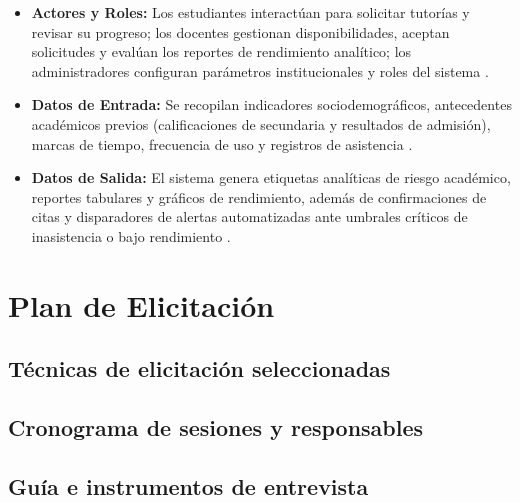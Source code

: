 \documentclass[11pt, a4paper]{article}
\begin{document}
\begin{itemize}
    \item \textbf{Actores y Roles:} Los estudiantes interactúan para solicitar tutorías y revisar su progreso; los docentes gestionan disponibilidades, aceptan solicitudes y evalúan los reportes de rendimiento analítico; los administradores configuran parámetros institucionales y roles del sistema \cite{cruz2025, molenaar2020, chamoun2025}.
    \item \textbf{Datos de Entrada:} Se recopilan indicadores sociodemográficos, antecedentes académicos previos (calificaciones de secundaria y resultados de admisión), marcas de tiempo, frecuencia de uso y registros de asistencia \cite{cruz2025, popescu2018, dequincey2019}.
    \item \textbf{Datos de Salida:} El sistema genera etiquetas analíticas de riesgo académico, reportes tabulares y gráficos de rendimiento, además de confirmaciones de citas y disparadores de alertas automatizadas ante umbrales críticos de inasistencia o bajo rendimiento \cite{chamoun2025, cruz2025, molenaar2020}.
\end{itemize}

\section{Plan de Elicitación}
\subsection{Técnicas de elicitación seleccionadas}
\subsection{Cronograma de sesiones y responsables}
\subsection{Guía e instrumentos de entrevista}
\end{document}
